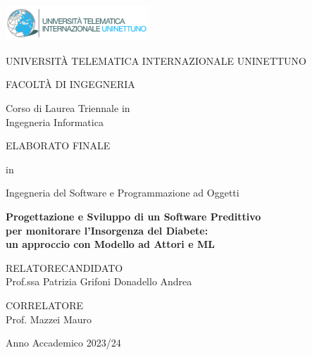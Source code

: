 \begin{titlepage}

    \begin{center}
        
        \includegraphics[width=0.4\textwidth]{images/nettuno_logo}

        \vspace{1cm}

        \huge UNIVERSITÀ TELEMATICA INTERNAZIONALE UNINETTUNO 

        \vspace{1.5cm}

        \LARGE FACOLTÀ DI INGEGNERIA \\

        \vspace{0.2cm}

        \Large Corso di Laurea Triennale in \\
        \Large Ingegneria Informatica \\
        
        \vspace{1cm}

        \large ELABORATO FINALE \\

        \vspace{0.2cm}

        \large in \\

        \vspace{0.2cm}

        \LARGE Ingegneria del Software e Programmazione ad Oggetti

        \vspace{1cm}

        \textbf{\LARGE Progettazione e Sviluppo di un Software Predittivo \\ per monitorare l'Insorgenza del Diabete: \\ un approccio con Modello ad Attori e ML}

        \vspace{1.5cm}

        \raggedright{
            \large RELATORE\hfill{CANDIDATO} \\
            \large Prof.ssa Patrizia Grifoni \hfill{Donadello Andrea}
            
            \vspace{1cm}

            \large CORRELATORE \\
            \large Prof. Mazzei Mauro
        }
        
        \centering
        
        \vfill
     
        \normalsize{Anno Accademico 2023/24}
                          
    \end{center}

 \end{titlepage}